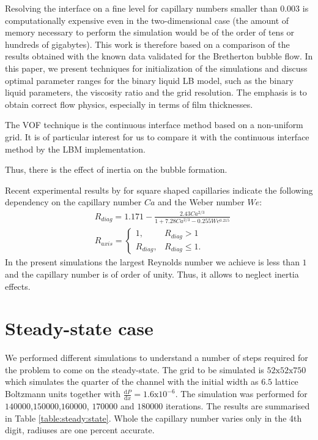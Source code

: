 \documentclass{article}
\begin{document}
Resolving the interface on a fine level for capillary numbers smaller than
$0.003$ is computationally expensive even in the two-dimensional case
(the amount of memory necessary to perform the simulation would be of the order
of tens or hundreds of gigabytes).  This work is therefore based on a
comparison of the results obtained with the known data
validated for the Bretherton bubble flow.  In this paper, we present
techniques for initialization of the simulations and discuss optimal
parameter ranges for the binary liquid LB model, such as the binary liquid parameters, the viscosity
ratio and the grid resolution. The emphasis is to obtain correct flow physics, especially in terms
of film thicknesses.





The VOF technique is the continuous
interface method based on a non-uniform grid. It is of particular interest for us to compare it
with the continuous interface method by the LBM implementation. 



Thus, there is the effect of
inertia on the bubble formation. 


Recent experimental results by \citet{shikazono-square} for square shaped capillaries indicate the
following dependency on the capillary number $Ca$ and the Weber number $We$:
\begin{equation}
\begin{aligned}
&R_{diag}=1.171-\frac{2.43 Ca^{2/3}}{1+7.28 Ca^{2/3}-0.255 We^{0.215}}\\
&R_{axis}=
\begin{cases}
1, &R_{diag}>1\\
R_{diag}, &R_{diag}\leq 1.
\end{cases}
\end{aligned}
\end{equation}
In the present
simulations the largest Reynolds number we achieve is less than $1$ and the capillary number is of
order of unity. Thus, it allows to neglect 
inertia effects. 




\section{Steady-state case}
We performed different simulations to understand a number of steps required for the problem to come
on the steady-state. The grid to be simulated is $52\mathrm{x}52\mathrm{x}750$ which simulates the
quarter of the channel with the initial
width as $6.5$ lattice Boltzmann units together with $\frac{\mathrm{d}P}{\mathrm{d}x}=1.6
\mathrm{x}10^{-6}$. The simulation was performed for $140000$,$150000$,$160000$, $170000$ and
$180000$ iterations. The results are summarised in Table \ref{table:steady:state}. Whole the
capillary number varies only in the 4th digit, radiuses are one percent accurate. 
\end{document}
